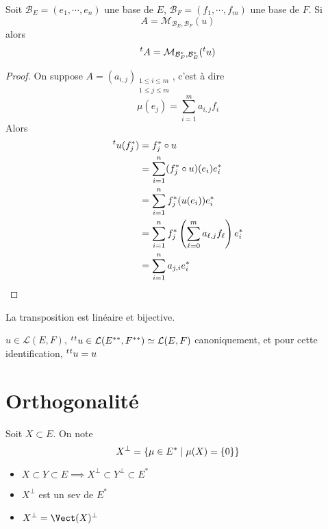 \begin{prop}
    Soit $\mathcal  B_E=(e_1, \cdots , e_n)$ une base de $E$,  $\mathcal  B_F=(f_1, \cdots , f_m)$ une base de $F$. Si  \[
        A=\mathcal  M_{\mathcal B_E, \mathcal  B_F}(u)
    \] 
    alors \[
        {}^t A = \mathcal  M_{\mathcal  B_F^*, \mathcal  B_E^*}({}^t u)
    \] 
\end{prop}

\begin{proof}
    On suppose $A=(a_{i,j})_{\substack{1\leq i \leq m \\ 1\leq j\leq m}}$, c'est à dire \[
        \mu(e_j)= \sum_{i=1}^{m} a_{i,j}f_i
    \] 
    Alors \begin{align*}
        {}^t u(f_j^*)&=f_j^*\circ u \\
                           &= \sum_{i=1}^{n} (f_j^*\circ u)(e_i)e_i^* \\
                           &= \sum_{i=1}^{n} f_j^*(u(e_i))e_i^* \\
                           &= \sum_{i=1}^{n} f_j^*\left( \sum_{\ell=0}^{m} a_{\ell,j}f_{\ell}\right)e_i^* \\
                           &= \sum_{i=1}^{n} a_{j,i}e_i^*
    \end{align*}
\end{proof}

\begin{cor}
La transposition est linéaire et bijective.
\end{cor}

\begin{cor}
    $u \in  \mathcal  L(E, F)$, ${}^t {}^t u \in  \mathcal  L(E^{**}, F^{**})\simeq \mathcal  L(E, F)$ canoniquement, et pour cette identification, ${}^t {}^t u=u$
\end{cor}

\section{Orthogonalité}

\begin{dfn}
    Soit $X \subset E$. On note \[
    X^\bot = \left\{ \mu \in  E^* \suchthat \mu(X)= \left\{ 0 \right\}  \right\} 
\] 
\end{dfn}

\begin{rem}
\begin{itemize}
    \item $X \subset Y \subset E \implies X^\bot \subset Y^\bot \subset E^*$
    \item $X^\bot$ est un sev de  $E^*$
    \item  $X^\bot =\Vect(X)^\bot$
\end{itemize}
\end{rem}

